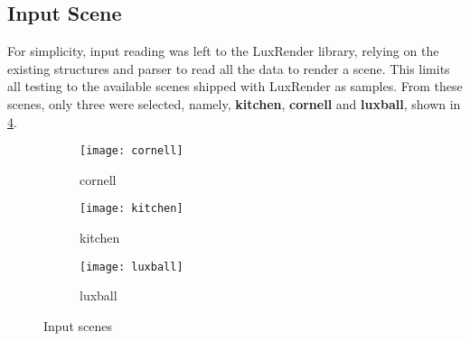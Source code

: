 \documentclass[main.tex]{subfiles}
\begin{document}
\subsection{Input Scene}

For simplicity, input reading was left to the LuxRender library, relying on the existing structures and parser to read all the data to render a scene. This limits all testing to the available scenes shipped with LuxRender as samples. From these scenes, only three were selected, namely, \textbf{kitchen}, \textbf{cornell} and \textbf{luxball}, shown in \cref{fig:scenes}.

\begin{figure}[!htp]
  \centering
  \begin{subfigure}[b]{.33\textwidth}
    \centering
    \texttt{[image: cornell]}
    \caption{cornell \label{fig:cornell}}
  \end{subfigure}%
  \begin{subfigure}[b]{.33\textwidth}
    \centering
    \texttt{[image: kitchen]}
    \caption{kitchen \label{fig:kitchen}}
  \end{subfigure}%
  \begin{subfigure}[b]{.33\textwidth}
    \centering
    \texttt{[image: luxball]}
    \caption{luxball \label{fig:luxball}}
  \end{subfigure}
  \caption{Input scenes \label{fig:scenes}}
\end{figure}
\end{document}
